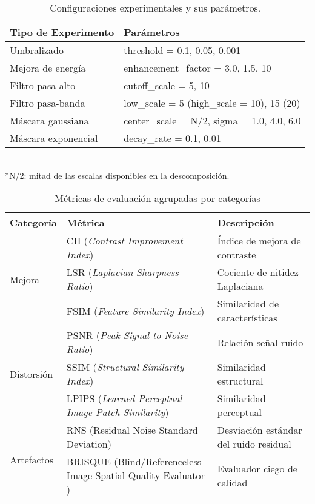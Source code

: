 \begin{table}[h]
    \centering
    \caption{Configuraciones experimentales y sus parámetros.}
    \label{tab:experimentos}
    \begin{tabular}{>{\raggedright}p{4cm}p{6cm}}
    \toprule
    \textbf{Tipo de Experimento} & \textbf{Parámetros} \\ 
    \midrule
    Umbralizado & threshold = 0.1, 0.05, 0.001 \\
    \midrule
    Mejora de energía & enhancement\_factor = 3.0, 1.5, 10 \\
    \midrule
    Filtro pasa-alto & cutoff\_scale = 5, 10 \\
    \midrule
    Filtro pasa-banda & low\_scale = 5 (high\_scale = 10), 15 (20) \\
    \midrule
    Máscara gaussiana & center\_scale = N/2, sigma = 1.0, 4.0, 6.0 \\
    \midrule
    Máscara exponencial & decay\_rate = 0.1, 0.01 \\
    \bottomrule
    \end{tabular}
    \footnotesize{\\*N/2: mitad de las escalas disponibles en la descomposición.}
\end{table}

\begin{table}[h]
    \centering
    \caption{Métricas de evaluación agrupadas por categorías\cite{Metrics}}
    \label{tab:metricas}
    \begin{tabular}{p{3cm}p{8cm}p{3cm}}
    \toprule
    \textbf{Categoría} & \textbf{Métrica} & \textbf{Descripción} \\ 
    \midrule
    \multirow{3}{*}{Mejora} 
    & CII (\textit{Contrast Improvement Index}) & Índice de mejora de contraste \\
    & LSR (\textit{Laplacian Sharpness Ratio}) & Cociente de nitidez Laplaciana \\
    & FSIM (\textit{Feature Similarity Index}) & Similaridad de características \\
    \midrule

    \multirow{3}{*}{Distorsión}
    & PSNR (\textit{Peak Signal-to-Noise Ratio}) & Relación señal-ruido \\
    & SSIM (\textit{Structural Similarity Index}) & Similaridad estructural \\
    & LPIPS (\textit{Learned Perceptual Image Patch Similarity}) & Similaridad perceptual \\
    \midrule

    \multirow{2}{*}{Artefactos}
    & RNS (Residual Noise Standard Deviation) & Desviación estándar del ruido residual \\
    & BRISQUE (Blind/Referenceless Image Spatial Quality Evaluator \cite{BRISQUE}) & Evaluador ciego de calidad \\
    \bottomrule
    \end{tabular}
\end{table}

